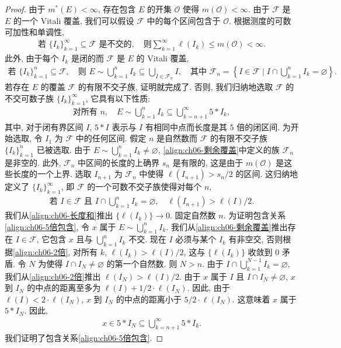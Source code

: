 \documentclass[../../main.tex]{subfiles}
\begin{document}
\begin{proof}
由于 $m^{*}(E)<\infty$, 存在包含 $E$ 的开集 $\mathcal{O}$ 使得 $m(\mathcal{O})<\infty$. 由于 $\mathcal{F}$ 是 $E$ 的一个 Vitali 覆盖, 我们可以假设 $\mathcal{F}$ 中的每个区间包含于 $\mathcal{O}$. 根据测度的可数可加性和单调性,
\begin{align}
\text{若 }\{I_{k}\}_{k=1}^{\infty}\subseteq\mathcal{F}\text{ 是不交的},\quad\text{则}\sum_{k=1}^{\infty}\ell(I_{k})\leqslant m(\mathcal{O})<\infty.\label{align:ch06-长度和}
\end{align}
此外, 由于每个 $I_{k}$ 是闭的而 $\mathcal{F}$ 是 $E$ 的 Vitali 覆盖,
\begin{align}
\text{若 }\{I_{k}\}_{k=1}^{n}\subseteq\mathcal{F},\quad\text{则 }E\sim\bigcup_{k=1}^{n}I_{k}\subseteq\bigcup_{I\in\mathcal{F}_{n}}I,\quad\text{其中 }\mathcal{F}_{n}=\left\{I\in\mathcal{F}\mid I\cap\bigcup_{k=1}^{n}I_{k}=\varnothing\right\}.\label{align:ch06-剩余覆盖}
\end{align}
若存在 $E$ 的覆盖 $\mathcal{F}$ 的有限不交子族, 证明就完成了. 否则, 我们归纳地选取 $\mathcal{F}$ 的不交可数子族 $\{I_{k}\}_{k=1}^{\infty}$, 它具有以下性质:
\begin{align}
\text{对所有 }n,\quad E\sim\bigcup_{k=1}^{n}I_{k}\subseteq\bigcup_{k=n+1}^{\infty}5*I_{k},\label{align:ch06-5倍包含}
\end{align}
其中, 对于闭有界区间 $I$, $5*I$ 表示与 $I$ 有相同中点而长度是其 $5$ 倍的闭区间. 为开始选取, 令 $I_{1}$ 为 $\mathcal{F}$ 中的任何区间. 假定 $n$ 是自然数而 $\mathcal{F}$ 的有限不交子族 $\{I_{k}\}_{k=1}^{n}$ 已被选取. 由于 $E\sim\bigcup_{k=1}^{n}I_{k}\neq\varnothing$, \eqref{align:ch06-剩余覆盖}中定义的族 $\mathcal{F}_{n}$ 是非空的. 此外, $\mathcal{F}_{n}$ 中区间的长度的上确界 $s_{n}$ 是有限的, 这是由于 $m(\mathcal{O})$ 是这些长度的一个上界. 选取 $I_{n+1}$ 为 $\mathcal{F}_{n}$ 中使得 $\ell(I_{n+1})>s_{n}/2$ 的区间. 这归纳地定义了 $\{I_{k}\}_{k=1}^{\infty}$, 即 $\mathcal{F}$ 的一个可数不交子族使得对每个 $n$,
\begin{align}
\text{若 }I\in\mathcal{F}\text{ 且 }I\cap\bigcup_{k=1}^{n}I_{k}=\varnothing,\quad\ell(I_{n+1})>\ell(I)/2.\label{align:ch06-2倍}
\end{align}
我们从\eqref{align:ch06-长度和}推出 $\{\ell(I_{k})\}\to 0$. 固定自然数 $n$. 为证明包含关系\eqref{align:ch06-5倍包含}, 令 $x$ 属于 $E\sim\bigcup_{k=1}^{n}I_{k}$. 我们从\eqref{align:ch06-剩余覆盖}推出存在 $I\in\mathcal{F}$, 它包含 $x$ 且与 $\bigcup_{k=1}^{n}I_{k}$ 不交. 现在 $I$ 必须与某个 $I_{k}$ 有非空交, 否则根据\eqref{align:ch06-2倍}, 对所有 $k$, $\ell(I_{k})>\ell(I)/2$, 这与 $\{\ell(I_{k})\}$ 收敛到 $0$ 矛盾. 令 $N$ 为使得 $I\cap I_{N}\neq\varnothing$ 的第一个自然数. 则 $N>n$. 由于 $I\cap\bigcup_{k=1}^{N-1}I_{k}=\varnothing$, 我们从\eqref{align:ch06-2倍}推出 $\ell(I_{N})>\ell(I)/2$. 由于 $x$ 属于 $I$ 且 $I\cap I_{N}\neq\varnothing$, $x$ 到 $I_{N}$ 的中点的距离至多为 $\ell(I)+1/2\cdot\ell(I_{N})$. 因此, 由于 $\ell(I)<2\cdot\ell(I_{N})$, $x$ 到 $I_{N}$ 的中点的距离小于 $5/2\cdot\ell(I_{N})$. 这意味着 $x$ 属于 $5*I_{N}$. 因此,
\begin{align*}
x\in 5*I_{N}\subseteq\bigcup_{k=n+1}^{\infty}5*I_{k}.
\end{align*}
我们证明了包含关系\eqref{align:ch06-5倍包含}.


\end{proof}
\end{document}
